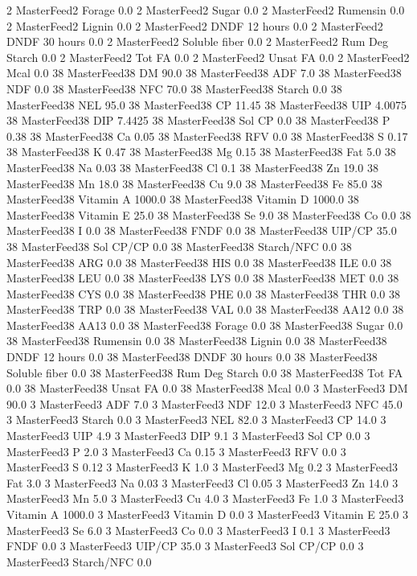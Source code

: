 \documentclass[letterpaper,10pt,english]{sphinxmanual}
\begin{document}
\begin{sphinxVerbatim}[commandchars=\\\{\},numbers=left,firstnumber=1,stepnumber=1]
2 MasterFeed2 \PYGZpc{} Forage 0.0
2 MasterFeed2 Sugar \PYGZpc{} 0.0
2 MasterFeed2 Rumensin 0.0
2 MasterFeed2 Lignin 0.0
2 MasterFeed2 DNDF 12 hours 0.0
2 MasterFeed2 DNDF 30 hours 0.0
2 MasterFeed2 Soluble fiber 0.0
2 MasterFeed2 Rum Deg Starch 0.0
2 MasterFeed2 Tot FA 0.0
2 MasterFeed2 Unsat FA 0.0
2 MasterFeed2 Mcal 0.0
38 MasterFeed38 DM 90.0
38 MasterFeed38 ADF 7.0
38 MasterFeed38 NDF 0.0
38 MasterFeed38 NFC 70.0
38 MasterFeed38 Starch 0.0
38 MasterFeed38 NEL 95.0
38 MasterFeed38 CP 11.45
38 MasterFeed38 UIP 4.0075
38 MasterFeed38 DIP 7.4425
38 MasterFeed38 Sol CP 0.0
38 MasterFeed38 P 0.38
38 MasterFeed38 Ca 0.05
38 MasterFeed38 RFV 0.0
38 MasterFeed38 S 0.17
38 MasterFeed38 K 0.47
38 MasterFeed38 Mg 0.15
38 MasterFeed38 Fat 5.0
38 MasterFeed38 Na 0.03
38 MasterFeed38 Cl 0.1
38 MasterFeed38 Zn 19.0
38 MasterFeed38 Mn 18.0
38 MasterFeed38 Cu 9.0
38 MasterFeed38 Fe 85.0
38 MasterFeed38 Vitamin A 1000.0
38 MasterFeed38 Vitamin D 1000.0
38 MasterFeed38 Vitamin E 25.0
38 MasterFeed38 Se 9.0
38 MasterFeed38 Co 0.0
38 MasterFeed38 I 0.0
38 MasterFeed38 FNDF 0.0
38 MasterFeed38 UIP/CP 35.0
38 MasterFeed38 Sol CP/CP 0.0
38 MasterFeed38 Starch/NFC 0.0
38 MasterFeed38 ARG 0.0
38 MasterFeed38 HIS 0.0
38 MasterFeed38 ILE 0.0
38 MasterFeed38 LEU 0.0
38 MasterFeed38 LYS 0.0
38 MasterFeed38 MET 0.0
38 MasterFeed38 CYS 0.0
38 MasterFeed38 PHE 0.0
38 MasterFeed38 THR 0.0
38 MasterFeed38 TRP 0.0
38 MasterFeed38 VAL 0.0
38 MasterFeed38 AA\PYGZsh{}12 0.0
38 MasterFeed38 AA\PYGZsh{}13 0.0
38 MasterFeed38 \PYGZpc{} Forage 0.0
38 MasterFeed38 Sugar \PYGZpc{} 0.0
38 MasterFeed38 Rumensin 0.0
38 MasterFeed38 Lignin 0.0
38 MasterFeed38 DNDF 12 hours 0.0
38 MasterFeed38 DNDF 30 hours 0.0
38 MasterFeed38 Soluble fiber 0.0
38 MasterFeed38 Rum Deg Starch 0.0
38 MasterFeed38 Tot FA 0.0
38 MasterFeed38 Unsat FA 0.0
38 MasterFeed38 Mcal 0.0
3 MasterFeed3 DM 90.0
3 MasterFeed3 ADF 7.0
3 MasterFeed3 NDF 12.0
3 MasterFeed3 NFC 45.0
3 MasterFeed3 Starch 0.0
3 MasterFeed3 NEL 82.0
3 MasterFeed3 CP 14.0
3 MasterFeed3 UIP 4.9
3 MasterFeed3 DIP 9.1
3 MasterFeed3 Sol CP 0.0
3 MasterFeed3 P 2.0
3 MasterFeed3 Ca 0.15
3 MasterFeed3 RFV 0.0
3 MasterFeed3 S 0.12
3 MasterFeed3 K 1.0
3 MasterFeed3 Mg 0.2
3 MasterFeed3 Fat 3.0
3 MasterFeed3 Na 0.03
3 MasterFeed3 Cl 0.05
3 MasterFeed3 Zn 14.0
3 MasterFeed3 Mn 5.0
3 MasterFeed3 Cu 4.0
3 MasterFeed3 Fe 1.0
3 MasterFeed3 Vitamin A 1000.0
3 MasterFeed3 Vitamin D 0.0
3 MasterFeed3 Vitamin E 25.0
3 MasterFeed3 Se 6.0
3 MasterFeed3 Co 0.0
3 MasterFeed3 I 0.1
3 MasterFeed3 FNDF 0.0
3 MasterFeed3 UIP/CP 35.0
3 MasterFeed3 Sol CP/CP 0.0
3 MasterFeed3 Starch/NFC 0.0

\end{sphinxVerbatim}
\end{document}
